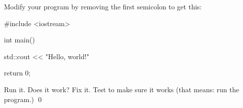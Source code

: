 Modify your program by removing the first semicolon to get this:
\begin{console}
#include <iostream>

int main()
{
    std::cout << "Hello, world!\n"

    return 0;
}
\end{console}
Run it. 
Does it work? 
Fix it. 
Test to make sure it works (that means: run the program.)
\qed
